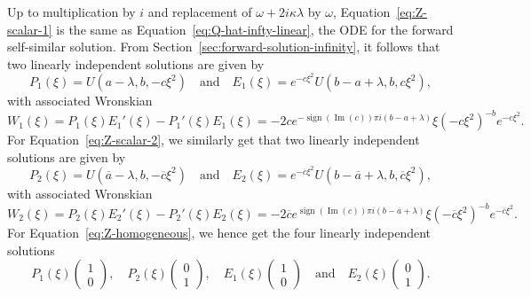 \documentclass[11pt]{article}
\DeclareMathOperator{\imag}{Im}
\DeclareMathOperator{\sign}{sign}
\newcommand{\conj}[1]{\overline{#1}}
\begin{document}
Up to multiplication by \(i\) and replacement of
\(\omega + 2i\kappa\lambda\) by \(\omega\),
Equation~\eqref{eq:Z-scalar-1} is the same as
Equation~\eqref{eq:Q-hat-infty-linear}, the ODE for the forward
self-similar solution. From
Section~\ref{sec:forward-solution-infinity}, it follows that two
linearly independent solutions are given by
\begin{equation*}
  P_{1}(\xi) = U\left(a - \lambda, b, -c\xi^{2}\right) \quad\text{and}\quad
  E_{1}(\xi) = e^{-c\xi^{2}}U\left(b - a + \lambda, b, c\xi^{2}\right),
\end{equation*}
with associated Wronskian
\begin{equation*}
  W_{1}(\xi) = P_{1}(\xi)E_{1}'(\xi) - P_{1}'(\xi)E_{1}(\xi)
  = -2ce^{-\sign(\imag(c)) \pi i (b - a + \lambda)}\xi \left(-c\xi^{2}\right)^{-b}e^{-c\xi^{2}}.
\end{equation*}
For Equation~\eqref{eq:Z-scalar-2}, we similarly get that two linearly
independent solutions are given by
\begin{equation*}
  P_{2}(\xi) = U\left(\conj{a} - \lambda, b, -\conj{c}\xi^{2}\right) \quad\text{and}\quad
  E_{2}(\xi) = e^{-\conj{c}\xi^{2}}U\left(b - \conj{a} + \lambda, b, \conj{c}\xi^{2}\right),
\end{equation*}
with associated Wronskian
\begin{equation*}
  W_{2}(\xi) = P_{2}(\xi)E_{2}'(\xi) - P_{2}'(\xi)E_{2}(\xi)
  = -2\conj{c}e^{\sign(\imag(c)) \pi i (b - \conj{a} + \lambda)}\xi \left(-\conj{c}\xi^{2}\right)^{-b}e^{-\conj{c}\xi^{2}}.
\end{equation*}
For Equation~\eqref{eq:Z-homogeneous}, we hence get the four linearly
independent solutions
\begin{equation*}
  P_{1}(\xi)\begin{pmatrix} 1 \\ 0 \end{pmatrix},\quad
  P_{2}(\xi)\begin{pmatrix} 0 \\ 1 \end{pmatrix},\quad
  E_{1}(\xi)\begin{pmatrix} 1 \\ 0 \end{pmatrix} \quad\text{and}\quad
  E_{2}(\xi)\begin{pmatrix} 0 \\ 1 \end{pmatrix}.
\end{equation*}
\end{document}
